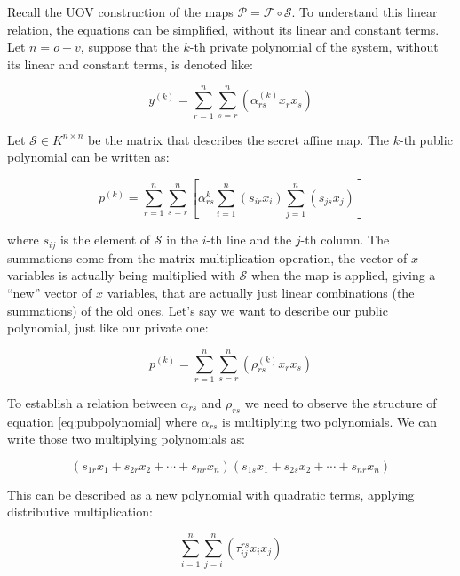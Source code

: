 \documentclass{ufsctex/ufsctex}
\begin{document}
Recall the UOV construction of the maps $\mathcal{P} = \mathcal{F} \circ
\mathcal{S}$. To understand this linear relation, the equations can be
simplified, without its linear and constant terms. Let $n = o + v$, suppose
that the $k$-th private polynomial of the system, without its linear and
constant terms, is denoted like:

\begin{equation}
y^{(k)} = \sum_{r=1}^n \sum_{s=r}^n\left(\alpha^{(k)}_{rs}x_rx_s\right)
\end{equation}

Let $\mathcal{S} \in K^{n \times n}$ be the matrix that describes the secret
affine map. The $k$-th public polynomial can be written as:

\begin{equation}\label{eq:pubpolynomial}
p^{(k)} = \sum_{r=1}^n \sum_{s=r}^n
\left[ \alpha^{k}_{rs} \sum_{i=1}^n(s_{ir}x_i) \sum_{j=1}^n(s_{js}x_j) \right]
\end{equation}

where $s_{ij}$ is the element of $\mathcal{S}$ in the $i$-th line and the
$j$-th column. The summations come from the matrix multiplication operation,
the vector of $x$ variables is actually being multiplied with $\mathcal{S}$
when the map is applied, giving  a ``new'' vector of $x$ variables, that are
actually just linear combinations (the summations) of the old ones. Let's say
we want to describe our public polynomial, just like our private one:

\begin{equation}
p^{(k)} = \sum_{r=1}^n \sum_{s=r}^n \left( \rho^{(k)}_{rs}x_rx_s \right)
\end{equation}

To establish a relation between $\alpha_{rs}$ and $\rho_{rs}$ we need to
observe the structure of equation \ref{eq:pubpolynomial} where $\alpha_{rs}$ is
multiplying two polynomials. We can write those two multiplying polynomials as:

\begin{equation}
(s_{1r}x_1 + s_{2r}x_2 + \cdots + s_{nr}x_n)
(s_{1s}x_1 + s_{2s}x_2 + \cdots + s_{nr}x_n)
\end{equation}

This can be described as a new polynomial with quadratic terms, applying
distributive multiplication:

\begin{equation}\label{eq:tau}
\sum_{i=1}^{n}\sum_{j=i}^n \left( \tau^{rs}_{ij} x_i x_j \right)
\end{equation}
\end{document}
